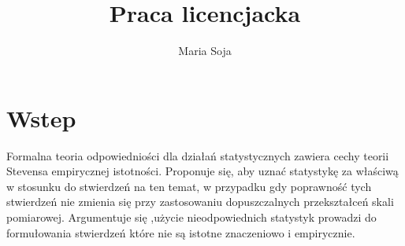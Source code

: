 \documentclass[12pt,a4paper]{report}
\author{Maria Soja}
\title{Praca licencjacka}
\begin{document}
\maketitle

\chapter{Wstep}
Formalna teoria odpowiedniości dla działań statystycznych zawiera cechy teorii Stevensa empirycznej istotności. Proponuje się, aby uznać statystykę za właściwą w stosunku do stwierdzeń na ten temat, w przypadku gdy poprawność tych stwierdzeń nie zmienia się przy zastosowaniu  dopuszczalnych przekształceń skali pomiarowej. Argumentuje się ,użycie nieodpowiednich statystyk prowadzi do formułowania stwierdzeń które nie są istotne znaczeniowo i empirycznie. %
\end{document}
